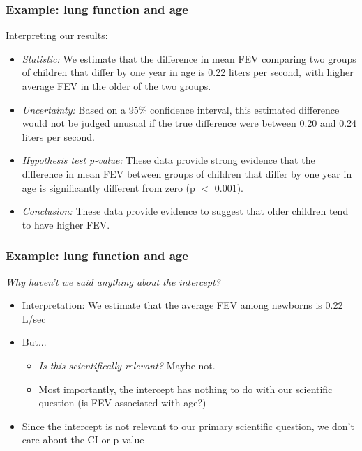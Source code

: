 \documentclass[12pt, 
hyperref={colorlinks=true, linkcolor=blue, urlcolor=cyan},dvipsnames]{beamer}
\begin{document}
\begin{frame}
\frametitle{Example: lung function and age}
Interpreting our results:\vspace{-0.3cm}
\begin{itemize}
\item \textit{Statistic:} We estimate that the difference in mean FEV comparing two groups of children that differ by one year in age is 0.22 liters per second, with higher average FEV in the older of the two groups. \pause
\item \textit{Uncertainty:} Based on a 95\% confidence interval, this estimated difference would not be judged unusual if the true difference were between 0.20 and 0.24 liters per second.\pause
\item \textit{Hypothesis test p-value:} These data provide strong evidence that the difference in mean FEV between groups of children that differ by one year in age is significantly different from zero (p $<$ 0.001). \pause
\item \textit{Conclusion:} These data provide evidence to suggest that older children tend to have higher FEV. 
\end{itemize}
\end{frame}

\begin{frame}
\frametitle{Example: lung function and age}
\textit{Why haven't we said anything about the intercept?} \pause
\begin{itemize}
\item Interpretation: We estimate that the average FEV among newborns is 0.22 L/sec \pause
\item But... 
	\begin{itemize}
	\item \textit{Is this scientifically relevant?} Maybe not.
	\item Most importantly, \color{blue} the intercept has nothing to do with our scientific question \color{black} (is FEV associated with age?) \pause
	\end{itemize}
\item Since the intercept is not relevant to our primary scientific question, we don't care about the CI or p-value
\end{itemize}
\end{frame}


\end{document}
